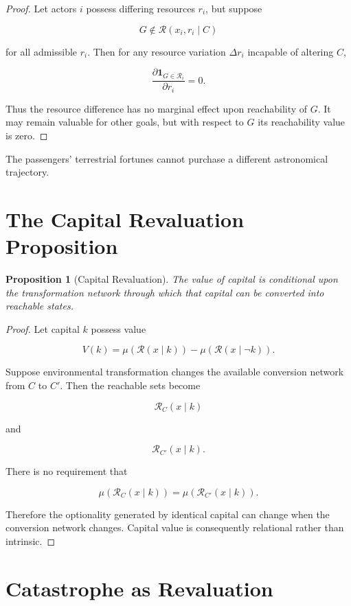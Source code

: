 \documentclass[11pt,oneside]{book}
\newtheorem{proposition}[theorem]{Proposition}
\theoremstyle{definition}
\theoremstyle{remark}
\newcommand{\R}{\mathcal{R}}
\begin{document}
\begin{proof}
Let actors \(i\) possess differing resources \(r_i\), but suppose

\[
G\notin\R(x_i,r_i\mid C)
\]

for all admissible \(r_i\). Then for any resource variation \(\Delta r_i\) incapable of altering \(C\),

\[
\frac{\partial
\mathbf 1_{G\in\R_i}}
{\partial r_i}
=
0.
\]

Thus the resource difference has no marginal effect upon reachability of \(G\). It may remain valuable for other goals, but with respect to \(G\) its reachability value is zero.
\end{proof}

The passengers' terrestrial fortunes cannot purchase a different astronomical trajectory.

\section{The Capital Revaluation Proposition}

\begin{proposition}[Capital Revaluation]
The value of capital is conditional upon the transformation network through which that capital can be converted into reachable states.
\end{proposition}

\begin{proof}
Let capital \(k\) possess value

\[
V(k)
=
\mu(\R(x\mid k))
-
\mu(\R(x\mid\neg k)).
\]

Suppose environmental transformation changes the available conversion network from \(C\) to \(C'\). Then the reachable sets become

\[
\R_C(x\mid k)
\]

and

\[
\R_{C'}(x\mid k).
\]

There is no requirement that

\[
\mu(\R_C(x\mid k))
=
\mu(\R_{C'}(x\mid k)).
\]

Therefore the optionality generated by identical capital can change when the conversion network changes. Capital value is consequently relational rather than intrinsic.
\end{proof}

\section{Catastrophe as Revaluation}
\end{document}
